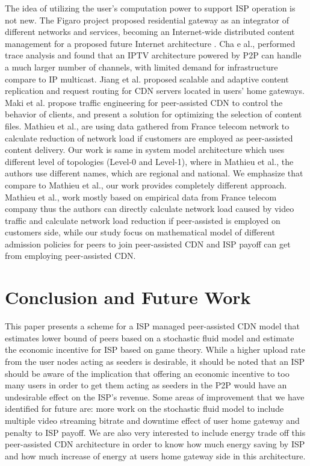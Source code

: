 \documentclass[JIP]{ipsj}
\begin{document}
The idea of utilizing the user's computation power to support ISP operation is not new.  The Figaro project \cite{figaro} proposed residential gateway as an integrator of different networks and services, becoming an Internet-wide distributed content management for a proposed future Internet architecture \cite{figaro}.  
Cha e al.,\cite{Cha:2008:NTP:1855641.1855646} performed trace analysis and found that an IPTV architecture powered by P2P can handle a much larger number of channels, with limited demand for infrastructure compare to IP multicast.  
Jiang et al. \cite{Jiang:2012:OMD:2413176.2413193} proposed scalable and adaptive content replication and request routing for CDN servers located in users' home gateways.  
Maki et al.\cite{NaoyaMAKI2012} propose traffic engineering for peer-assisted CDN to control the behavior of clients, and present a solution for optimizing the selection of content files.
Mathieu et al., \cite{6249305} are using data gathered from France telecom network to calculate reduction of network load if customers are employed as peer-assisted content delivery.
Our work is same in system model architecture which uses different level of topologies  (Level-0 and Level-1), where in Mathieu et al., \cite{6249305} the authors use different names, which are regional and national. 
We emphasize that compare to  Mathieu et al., \cite{6249305} our work provides completely different approach.
Mathieu et al., \cite{6249305} work mostly based on empirical data from France telecom company thus the authors can directly calculate network load caused by video traffic and calculate network load reduction if peer-assisted is employed on customers side,  while our study focus on mathematical model of different admission policies for peers to join peer-assisted CDN and ISP payoff can get from employing peer-assisted CDN.


\section{Conclusion and Future Work}\label{conclusion}

This paper presents a scheme for a ISP managed peer-assisted CDN model that estimates lower bound of peers based on a stochastic fluid model and estimate the economic incentive for ISP based on game theory.
While a higher upload rate from the user nodes acting as seeders is desirable, it should be noted that an ISP should be aware of the implication that offering an economic incentive to too many users in order to get them acting as seeders in the P2P would have an undesirable effect on the ISP's revenue.
Some areas of improvement that we have identified for future are:
more work on the stochastic fluid model to include multiple video streaming bitrate and downtime effect of user home gateway and penalty to ISP payoff. 
We are also very interested to include energy trade off this peer-assisted CDN architecture in order to know how much energy saving by ISP and how much increase of energy at users home gateway side in this architecture.
\end{document}
